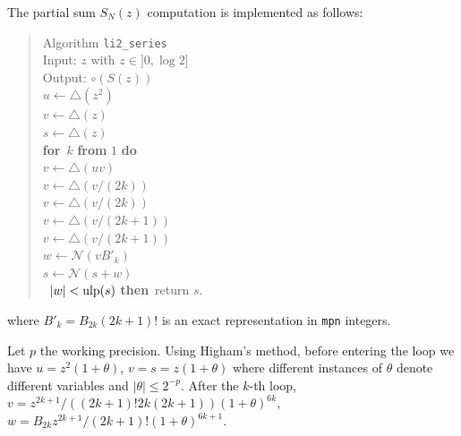 \documentclass[12pt]{amsart}
\def\pinf{\bigtriangleup}
\def\q{\hspace*{5mm}}
\def\ulp{{\rm ulp}}
\def\N{{\mathcal N}}
\def\If{{\bf if}}
\def\then{{\bf then}}
\def\for{{\bf for}}
\begin{document}
The partial sum $S_N(z)$ computation is implemented as follows: 
\begin{quote}
Algorithm {\tt li2\_series}\\
Input: $z$ with $z \in  ]0, \log2]$\\
Output: $\circ(S(z))$\\
$u \leftarrow \pinf(z^2)$ \\
$v \leftarrow \pinf(z)$ \\
$s \leftarrow \pinf(z)$ \\
\for\ $k$ {\bf from} $1$ {\bf do}\\
\q $v \leftarrow \pinf(u v)$ \\
\q $v \leftarrow \pinf(v / (2k))$\\
\q $v \leftarrow \pinf(v / (2k))$\\
\q $v \leftarrow \pinf(v / (2k+1))$\\
\q $v \leftarrow \pinf(v / (2k+1))$\\
\q $w \leftarrow \N(v B'_k)$\\
\q $s \leftarrow \N(s + w)$\\
\q \If\ $|w| < \ulp(s)$ \then\ return $s$.\\
\end{quote}
where $B'_k = B_{2k} (2k+1)!$ is an exact representation in \texttt{mpn}
integers.

Let $p$ the working precision. Using Higham's method, before entering the loop
we have $u = z^2(1+\theta)$, $v = s = z(1+\theta)$ where different instances
of $\theta$ denote different variables and $|\theta| \leq 2^{-p}$. After the 
$k$-th loop, $v = z^{2k+1}/((2k+1)!2k(2k+1)) (1+\theta)^{6k}$,
$w = B_{2k}z^{2k+1}/(2k+1)! (1+\theta)^{6k+1}$.
\end{document}
